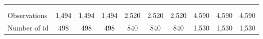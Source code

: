 \begin{center}
\begin{tabular}{lccccccccc}
 & \begin{footnotesize}[0.000]\end{footnotesize} & \begin{footnotesize}[0.904]\end{footnotesize} & \begin{footnotesize}[0.648]\end{footnotesize} & \begin{footnotesize}[0.002]\end{footnotesize} & \begin{footnotesize}[0.693]\end{footnotesize} & \begin{footnotesize}[0.247]\end{footnotesize} & \begin{footnotesize}[0.000]\end{footnotesize} & \begin{footnotesize}[0.079]\end{footnotesize} & \begin{footnotesize}[0.000]\end{footnotesize} \\
\vspace{4pt} & \begin{footnotesize}\end{footnotesize} & \begin{footnotesize}\end{footnotesize} & \begin{footnotesize}\end{footnotesize} & \begin{footnotesize}\end{footnotesize} & \begin{footnotesize}\end{footnotesize} & \begin{footnotesize}\end{footnotesize} & \begin{footnotesize}\end{footnotesize} & \begin{footnotesize}\end{footnotesize} & \begin{footnotesize}\end{footnotesize} \\
Observations & 1,494 & 1,494 & 1,494 & 2,520 & 2,520 & 2,520 & 4,590 & 4,590 & 4,590 \\
Number of id & 498 & 498 & 498 & 840 & 840 & 840 & 1,530 & 1,530 & 1,530 \\

\end{tabular}
\end{center}
